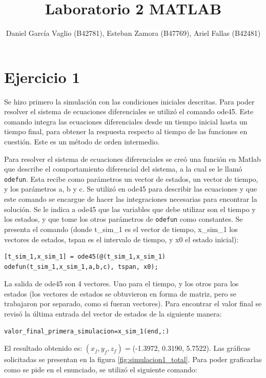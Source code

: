 \documentclass[12pt,letterpaper]{article}
\begin{document}
\title{Laboratorio 2 MATLAB}
\author{Daniel García Vaglio (B42781), Esteban Zamora (B47769), Ariel Fallas (B42481)}
\maketitle

\section{Ejercicio 1}
Se hizo primero la simulación con las condiciones iniciales descritas. Para poder resolver el
sistema de ecuaciones diferenciales se utilizó el comando ode45. Este comando integra las ecuaciones
diferenciales desde un tiempo inicial hasta un tiempo final, para obtener la respuesta respecto al
tiempo de las funciones en cuestión. Este es un método de orden intermedio.

Para resolver el sistema de ecuaciones diferenciales se creó una función en Matlab que describe el
comportamiento diferencial del sistema, a la cual se le llamó \texttt{odefun}. Esta recibe como
parámetros un vector de estados, un vector de tiempo, y los parámetros a, b y c. Se utilizó en ode45
para describir las ecuaciones y que este comando se encargue de hacer las integraciones necesarias
para encontrar la solución. Se le indica a ode45 que las variables que debe utilizar son el tiempo y
los estados, y que tome los otros parámetros de \texttt{odefun} como constantes. Se presenta el comando
(donde t\_sim\_1 es el vector de tiempo, x\_sim\_1 los vectores de estados, tspan es el intervalo de
tiempo, y x0 el estado inicial):

\begin{lstlisting}[style=Matlab-editor, basicstyle=\mlttfamily]
    [t_sim_1,x_sim_1] = ode45(@(t_sim_1,x_sim_1) odefun(t_sim_1,x_sim_1,a,b,c), tspan, x0);
\end{lstlisting}

La salida de ode45 son 4 vectores. Uno para el tiempo, y los otros para los estados (los vectores de
estados se obtuvieron en forma de matriz, pero se trabajaron por separado, como si fueran
vectores). Para encontrar el valor final se revisó la última entrada del vector de estados de la
siguiente manera:


\begin{lstlisting}[style=Matlab-editor, basicstyle=\mlttfamily]
    valor_final_primera_simulacion=x_sim_1(end,:)
\end{lstlisting}

El resultado obtenido es: $(x_f, y_f, z_f)=$(-1.3972, 0.3190, 5.7522).  Las gráficas solicitadas se
presentan en la figura \ref{fig:simulacion1_total}. Para poder graficarlas como se pide en el
enunciado, se utilizó el siguiente comando:
\end{document}
